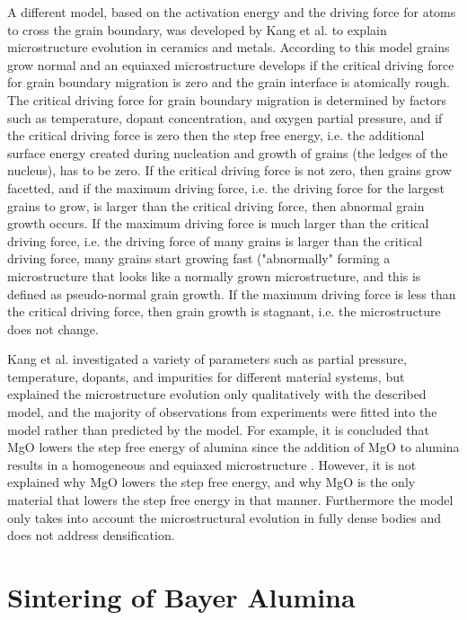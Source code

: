 A different model, based on the activation energy and the driving force for atoms to cross the grain boundary, was developed by Kang et al. \cite{Kang2004,Kang2009,Kang2016} to explain microstructure evolution in ceramics and metals. According to this model grains grow normal and an equiaxed microstructure develops if the critical driving force for grain boundary migration is zero and the grain interface is atomically rough. The critical driving force for grain boundary migration is determined by factors such as temperature, dopant concentration, and oxygen partial pressure, and if the critical driving force is zero then the step free energy, i.e. the additional surface energy created during nucleation and growth of grains (the ledges of the nucleus), has to be zero. If the critical driving force is not zero, then grains grow facetted, and if the maximum driving force, i.e. the driving force for the largest grains to grow, is larger than the critical driving force, then abnormal grain growth occurs. If the maximum driving force is much larger than the critical driving force, i.e. the driving force of many grains is larger than the critical driving force, many grains start growing fast ("abnormally" forming a microstructure that looks like a normally grown microstructure, and this is defined as pseudo-normal grain growth. If the maximum driving force is less than the critical driving force, then grain growth is stagnant, i.e. the microstructure does not change. 

Kang et al. \cite{Kang2016,Kang2009} investigated a variety of parameters such as partial pressure, temperature, dopants, and impurities for different material systems, but explained the microstructure evolution only qualitatively with the described model, and the majority of observations from experiments were fitted into the model rather than predicted by the model. For example, it is concluded that MgO lowers the step free energy of alumina since the addition of MgO to alumina results in a homogeneous and equiaxed microstructure \cite{Jo2006}. However, it is not explained why MgO lowers the step free energy, and why MgO is the only material that lowers the step free energy in that manner. Furthermore the model only takes into account the microstructural evolution in fully dense bodies and does not address densification.

\section{Sintering of Bayer Alumina}

